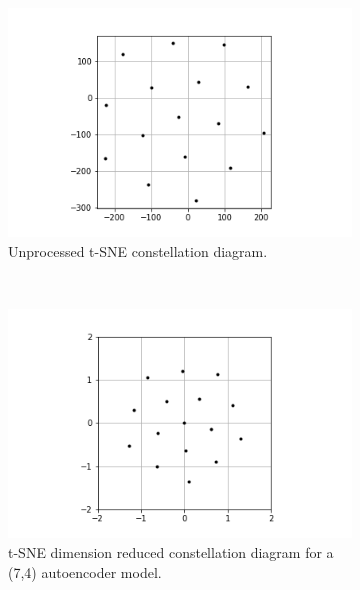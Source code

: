 \documentclass[12pt,onecolumn,letterpaper]{article}
\begin{document}
\begin{figure}[t!]
   \centering
   \begin{subfigure}[t]{0.3\textwidth}
      \centering
      \includegraphics[width=\linewidth]{figures/tSNE_7_4_constellation_diagram_unnormalised.png}
      \caption{Unprocessed t-SNE constellation diagram.}
  \end{subfigure}
  ~
  \begin{subfigure}[t]{0.3\textwidth}
       \centering
       \includegraphics[width=\linewidth]{figures/leaky_relu_7_4_constellation_diagram.png}
       \caption{t-SNE dimension reduced constellation diagram for a (7,4) autoencoder model.}
   \end{subfigure}
   ~
   \begin{subfigure}[t]{0.3\textwidth}
       \centering

\end{subfigure}
\end{figure}
\end{document}

